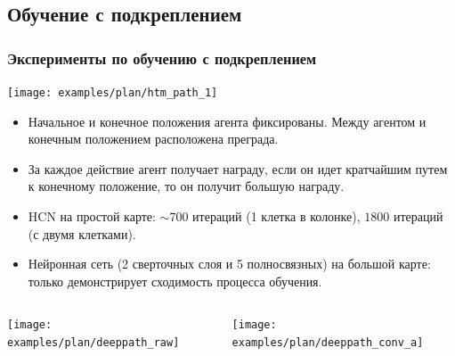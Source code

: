 \documentclass[default]{beamer}
\begin{document}
	\subsection{Обучение с подкреплением}
	\begin{frame}
		\frametitle{Эксперименты по обучению с подкреплением}
		\footnotesize
		\centering
		\texttt{[image: examples/plan/htm\_path\_1]}
		
		\begin{itemize}
			\item Начальное и конечное положения агента фиксированы. Между агентом и конечным положением расположена преграда.
			\item За каждое действие агент получает награду, если он идет кратчайшим путем к конечному положение, то он получит большую награду. 
			\item HCN на простой карте: $\sim 700$ итераций (1 клетка в колонке), $1800$ итераций (с двумя клетками).
			\item Нейронная сеть (2 сверточных слоя и 5 полносвязных) на большой карте: только демонстрирует сходимость процесса обучения. 
		\end{itemize}
		\vspace{-5pt}
		\begin{columns}
			\begin{column}{0.5\textwidth}
				\centering
				\texttt{[image: examples/plan/deeppath\_raw]}
			\end{column}
			\begin{column}{0.5\textwidth}
				\centering
				\texttt{[image: examples/plan/deeppath\_conv\_a]}
			\end{column}
		\end{columns}
	
	\end{frame}	
\end{document}
